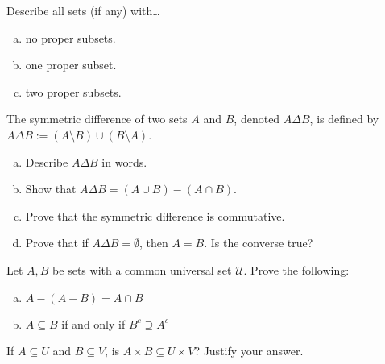 \documentclass[11pt,letterpaper]{article}
\begin{document}

 Describe all sets (if any) with\dots
        \begin{enumerate}[(a)] 
        \item no proper subsets. 
        \item one proper subset. 
        \item two proper subsets. 
        \end{enumerate}





\newpage





 The symmetric difference of two sets $A$ and $B$, denoted $A \Delta B$, is defined by $A \Delta B:= (A \setminus B) \cup (B \setminus A)$. 
	\begin{enumerate}[(a)]
	\item Describe $A \Delta B$ in words. 
	\item Show that $A \Delta B= (A \cup B) - (A \cap B)$.
	\item Prove that the symmetric difference is commutative. 
	\item Prove that if $A \Delta B= \emptyset$, then $A= B$. Is the converse true? 
	\end{enumerate}





\newpage





 Let $A, B$ be sets with a common universal set $\mathscr{U}$. Prove the following:
	\begin{enumerate}[(a)]
	\item $A - (A - B)= A \cap B$
	\item $A \subseteq B$ if and only if $B^c \supseteq A^c$
	\end{enumerate}





\newpage





 If $A \subseteq U$ and $B \subseteq V$, is $A \times B \subseteq U \times V$? Justify your answer. \pspace
\end{document}

